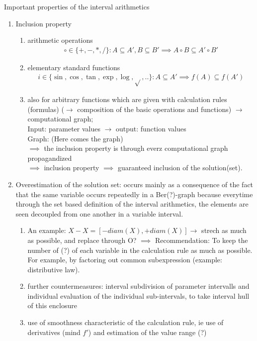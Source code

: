 \begin{itemize}
Important properties of the interval arithmetics 
\begin{enumerate}
\item Inclusion property
\begin{enumerate}
	\item arithmetic operations
		\begin{align*}
			\circ \in\{+,-,*,/\}: A\subseteq A', B\subseteq B' \implies A\circ B\subseteq A' \circ B'
		\end{align*}
	\item elementary standard functions
		\begin{align*}
			i \in \{\sin, \cos, \tan, \exp, \log, \sqrt{},..\}:A\subseteq A' \implies f(A)\subseteq f(A')
		\end{align*}
	\item also for arbitrary functions which are given with calculation rules (formulas) ($\to$ composition of the basic operations and functions) $\to$ computational graph; \\
	Input: parameter values $\to$ output: function values \\
	Graph: (Here comes the graph) \\
	$\implies$ the inclusion property is through everz computational graph propagandized \\
	$\implies$ inclusion property $\implies$ guaranteed inclusion of the solution(set). 
\end{enumerate}
\item Overestimation of the solution set: occurs mainly as a consequence  of the fact that the same variable   occurs repeatedly in a Ber(?)-graph because everytime through the set based definition of the interval arithmetics, the elements are seen decoupled from one another in a variable interval.
\begin{enumerate}
	\item An example: $X-X=[-diam(X),+diam(X)]\to$ strech as much as possible, and replace through O?
	$\implies$ Recommendation: To keep the number of (?) of each variable in the calculation rule as much as possible. For example, by factoring out common subexpression (example: distributive law).
	\item further countermeasures: interval subdivision of parameter intervalls and individual evaluation of the individual sub-intervals, to take interval hull of this enclosure
	\item use of smoothness characteristic of the calculation rule, ie use of derivatives (mind $f'$) and estimation of the value range (?)

\end{enumerate}
\end{enumerate}
\end{itemize}
